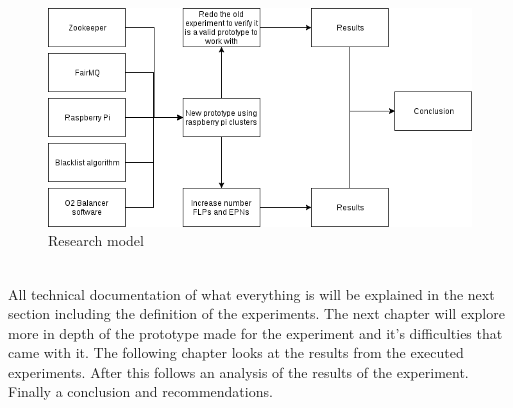 \begin{figure}[htb]
	\centering
	\includegraphics[scale=0.5]{./graphics/ResearchModel.png}
	\caption{Research model}
	\label{fig:ResearchModel}
\end{figure}

~\\ All technical documentation of what everything is will be explained in the next section including the definition of the experiments.
The next chapter will explore more in depth of the prototype made for the experiment and it's difficulties that came with it. The following chapter looks at the results from the  executed experiments. After this follows an analysis of the results of the experiment. Finally a conclusion and recommendations.